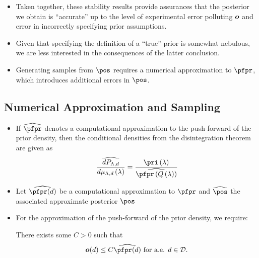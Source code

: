 \begin{frame}[t]
\begin{itemize}

	\item <1->Taken together, these stability results provide assurances that the posterior we obtain is ``accurate'' up to the level of experimental error polluting $\operatorname*{\boldsymbol{o}}$ and error in incorrectly specifying prior assumptions. 
	\item <2-> Given that specifying the definition of a ``true'' prior is somewhat nebulous, we are less interested in the consequences of the latter conclusion.
	\item <3-> Generating samples from $\pos$ requires a numerical approximation to $\pfpr$, which introduces additional errors in $\pos$.
	
\end{itemize}

\end{frame}


\subsection{Numerical Approximation and Sampling}
\begin{frame}[t]
\begin{itemize}
	\item <1-> If $\widehat{\pfpr}$ denotes a computational approximation to the push-forward of the prior density, then the conditional densities from the disintegration theorem are given as
\[
\frac{\widehat{dP_{\pspace, d}}}{d\mu_{\pspace, d}\lam} = \frac{\pri\lam}{ \widehat{\pfpr\q} }
\]
	\item <2-> Let $\widehat{\pfpr(d)}$ be a computational approximation to $\pfpr$ and $\widehat{\pos}$ the associated approximate posterior $\pos$
	\item <3-> For the approximation of the push-forward of the prior density, we require:
\begin{assumption}\label{as:predx}
There exists some $C>0$ such that
\[
\obs (d) \leq C \widehat{\pfpr(d)} \text{ for a.e. } d\in \dspace.
\]
\end{assumption}

\end{itemize}

\end{frame}


